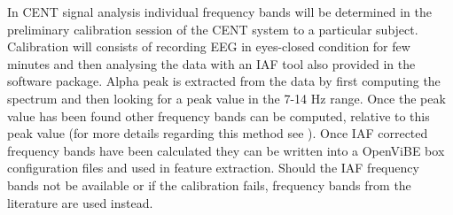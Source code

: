 In CENT signal analysis individual frequency bands will be determined in the preliminary calibration session of the CENT system to a particular subject. Calibration will consists of recording EEG in eyes-closed condition for few minutes and then analysing the data with an IAF tool also provided in the software package. Alpha peak is extracted from the data by first computing the spectrum and then looking for a peak value in the 7-14 Hz range. Once the peak value has been found other frequency bands can be computed, relative to this peak value (for more details regarding this method see \cite{babiloni2010reactivity}). Once IAF corrected frequency bands have been calculated they can be written into a OpenViBE box configuration files and used in feature extraction. Should the IAF frequency bands not be available or if the calibration fails, frequency bands from the literature are used instead.
